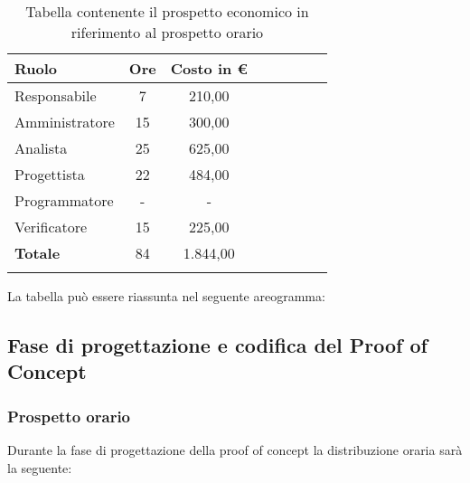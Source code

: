 			\begin{longtable}{|l|c|c|c|c|c|c|c|}
				\hline
				\rowcolor{lighter-grayer}
				\textbf{Ruolo} & \textbf{Ore} & \textbf{Costo in €} \\
				\hline
				\endfirsthead
				
				\hline
				Responsabile & 7 & 210,00\\
				\hline
				\hline
				Amministratore & 15 & 300,00\\
				\hline
				\hline
				Analista & 25 & 625,00\\
				\hline
				\hline
				Progettista & 22 & 484,00\\
				\hline
				\hline
				Programmatore & - & -\\
				\hline
				\hline
				Verificatore & 15 & 225,00\\
				\hline
				\textbf{Totale} & 84 & 1.844,00\\
				\hline
				\caption{Tabella contenente il prospetto economico in riferimento al prospetto orario}
			\end{longtable}
			\pagebreak
		
			La tabella può essere riassunta nel seguente areogramma:

			\subsection{Fase di progettazione e codifica del Proof of Concept}
            \subsubsection{Prospetto orario}
			Durante la fase di progettazione della proof of concept la distribuzione oraria sarà la seguente:
			

